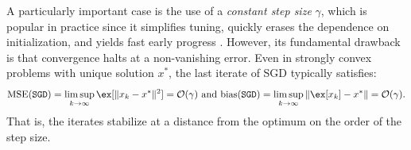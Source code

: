 A particularly important case is the use of a \emph{constant step size} $\gamma$, which is popular in practice since it simplifies tuning, quickly erases the dependence on initialization, and yields fast early progress \citep{yu2021analysis}. However, its fundamental drawback is that convergence halts at a non-vanishing error. Even in strongly convex problems with unique solution $x^*$, the last iterate of SGD typically satisfies: \[\text{$\text{MSE}(\texttt{SGD})=\limsup_{k\to\infty}\ex[\|x_k-x^*\|^2]=\mathcal{O}(\gamma)$ and $\text{bias}(\texttt{SGD})=\limsup_{k\to\infty}\|\ex[x_k]-x^*\|=\mathcal{O}(\gamma)$.}\] That is, the iterates stabilize at a distance from the optimum on the order of the step size.

%
%
%
%

